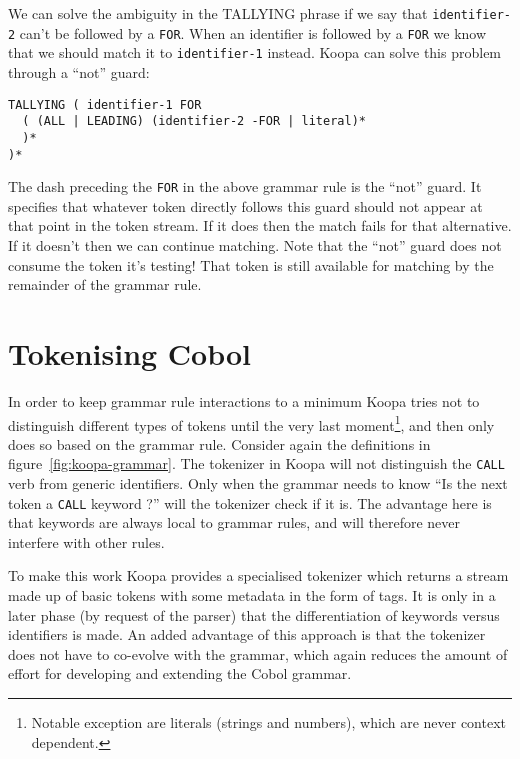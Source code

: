 \documentclass[a4paper]{article}
\begin{document}
We can solve the ambiguity in the TALLYING phrase if we say that \lstinline|identifier-2| can't be followed by a \lstinline|FOR|. When an identifier is followed by a \lstinline|FOR| we know that we should match it to \lstinline|identifier-1| instead. Koopa can solve this problem through a ``not'' guard:
\begin{lstlisting}[numbers=none]
TALLYING ( identifier-1 FOR
  ( (ALL | LEADING) (identifier-2 -FOR | literal)*
  )*
)*
\end{lstlisting}
The dash preceding the \lstinline|FOR| in the above grammar rule is the ``not'' guard. It specifies that whatever token directly follows this guard should not appear at that point in the token stream. If it does then the match fails for that alternative. If it doesn't then we can continue matching. Note that the ``not'' guard does not consume the token it's testing! That token is still available for matching by the remainder of the grammar rule.


\section{Tokenising Cobol}
\label{tokenisation}

In order to keep grammar rule interactions to a minimum Koopa tries not to distinguish different types of tokens until the very last moment\footnote{\scriptsize Notable exception are literals (strings and numbers), which are never context dependent.}, and then only does so based on the grammar rule. Consider again the definitions in figure~\ref{fig:koopa-grammar}. The tokenizer in Koopa will not distinguish the \lstinline|CALL| verb from generic identifiers. Only when the grammar needs to know ``Is the next token a \lstinline|CALL| keyword ?'' will the tokenizer check if it is. The advantage here is that keywords are always local to grammar rules, and will therefore never interfere with other rules.

To make this work Koopa provides a specialised tokenizer which returns a stream made up of basic tokens with some metadata in the form of tags. It is only in a later phase (by request of the parser) that the differentiation of keywords versus identifiers is made. An added advantage of this approach is that the tokenizer does not have to co-evolve with the grammar, which again reduces the amount of effort for developing and extending the Cobol grammar.
\end{document}
